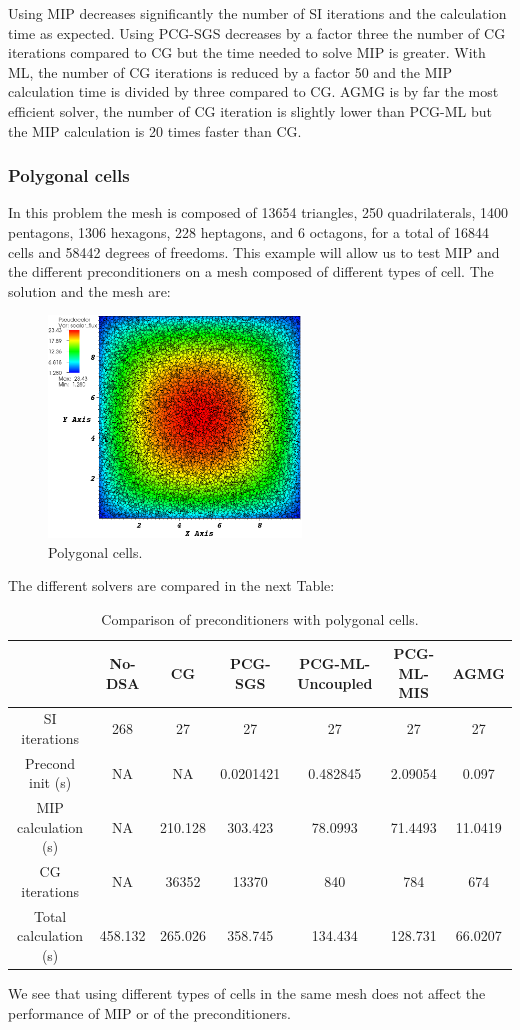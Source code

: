 Using MIP decreases significantly the number of SI iterations and the
calculation time as expected. Using PCG-SGS decreases by a factor three the 
number of CG iterations compared to CG but the time needed to solve MIP is
greater. With ML, the number of CG iterations is reduced by a factor 50 and 
the MIP calculation time is divided by three compared to CG. AGMG is by far 
the most efficient solver, the number of CG iteration is slightly lower 
than PCG-ML but the MIP calculation is 20 times faster than CG.

\subsubsection{Polygonal cells}
In this problem the mesh is composed of 13654 triangles, 250 quadrilaterals,
1400 pentagons, 1306 hexagons, 228 heptagons, and 6 octagons, for a total of
16844 cells and 58442 degrees of freedoms. This example will allow us to test
MIP and the different preconditioners on a mesh composed of different types of
cell. The solution and the mesh are:
\begin{figure}[H]
\centering
\includegraphics[width=0.6\textwidth]{homog_poly_crop}
\caption{Polygonal cells.}
\end{figure}
The different solvers are compared in the next Table:
\begin{table}[H]
\begin{center}
\begin{tabular}{|c|c|c|c|c|c|c|}
\hline
 & No-DSA & CG & PCG-SGS & PCG-ML-Uncoupled & PCG-ML-MIS & AGMG\\
\hline
SI iterations & 268 & 27 & 27 & 27 & 27 & 27\\
Precond init (s) & NA & NA & 0.0201421 & 0.482845 & 2.09054 & 0.097\\
MIP calculation (s) & NA & 210.128 & 303.423 & 78.0993 & 71.4493 & 11.0419\\
CG iterations & NA & 36352 & 13370 & 840 & 784 & 674\\
Total calculation (s) & 458.132 & 265.026 & 358.745 & 134.434 & 128.731 &
66.0207\\
\hline
\end{tabular}
\caption{Comparison of preconditioners with polygonal cells.}
\end{center}
\end{table}
We see that using different types of cells in the same mesh does not affect
the performance of MIP or of the preconditioners. 

